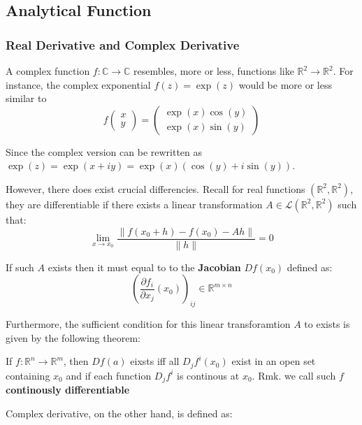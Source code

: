 \subsection{Analytical Function}

\subsubsection{Real Derivative and Complex Derivative}

A complex function $f:\mathbb{C}\to \mathbb{C}$ resembles, more or less, functions like $\mathbb{R}^2\to \mathbb{R}^2$. For instance, the complex exponential $f(z)=\exp(z)$ would be more or less similar to
\begin{equation}
f\begin{pmatrix}
        x \\
        y
    \end{pmatrix} = 
    \begin{pmatrix}
        \exp(x)\cos(y) \\
        \exp(x)\sin(y)
    \end{pmatrix}
\end{equation}

Since the complex version can be rewritten as $\exp(z)=\exp(x+iy)=\exp(x)(\cos(y) + i\sin(y))$.

However, there does exist crucial differencies. Recall for real functions $(\mathbb{R}^2, \mathbb{R}^2)$, they are differentiable if there exists a linear transformation $A\in \mathcal L (\mathbb{R}^2, \mathbb{R}^2)$ such that:
\begin{equation}
\lim_{x\to x_0} \frac{\|f(x_0+h)-f(x_0) - Ah\|}{\|h\|}=0
\end{equation}

If such $A$ exists then it must equal to to the \textbf{Jacobian} $Df(x_0)$ defined as:
\begin{equation}
\left(\frac{\partial f_i}{\partial x_j}(x_0)\right)_{ij} \in \mathbb{R}^{m\times n}
\end{equation}

Furthermore, the sufficient condition for this linear transforamtion $A$ to exists is given by the following theorem:

\begin{theorem}If $f:\mathbb{R}^n\to \mathbb{R}^m$, then $Df(a)$ eixsts iff all $D_jf^{i}(x_0)$ exist in an open set containing $x_0$ and if each function $D_jf^i$ is continous at $x_0$.
Rmk. we call such $f$ \textbf{continously differentiable}

\end{theorem}Complex derivative, on the other hand, is defined as:


